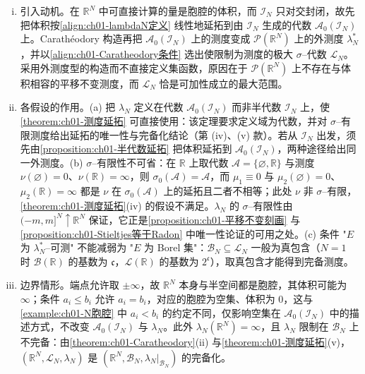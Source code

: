 \documentclass[../../main.tex]{subfiles}%
\begin{document}
\begin{remark}\label{remark:ch01-Lebesgue测度构造}
\begin{enumerate}[(i)]
\item 引入动机。在 $\mathbb{R}^N$ 中可直接计算的量是胞腔的体积，而 $\mathcal{I}_N$ 只对交封闭，故先把体积按\eqref{align:ch01-lambdaN定义} 线性地延拓到由 $\mathcal{I}_N$ 生成的代数 $\mathcal{A}_0(\mathcal{I}_N)$ 上。Carathéodory 构造再把 $\mathcal{A}_0(\mathcal{I}_N)$ 上的测度变成 $\mathcal{P}(\mathbb{R}^N)$ 上的外测度 $\lambda_N^*$，并以\eqref{align:ch01-Caratheodory条件} 选出使限制为测度的极大 $\sigma$--代数 $\mathcal{L}_N$。采用外测度型的构造而不直接定义集函数，原因在于 $\mathcal{P}(\mathbb{R}^N)$ 上不存在与体积相容的平移不变测度，而 $\mathcal{L}_N$ 恰是可加性成立的最大范围。
\item 各假设的作用。(a) 把 $\lambda_N$ 定义在代数 $\mathcal{A}_0(\mathcal{I}_N)$ 而非半代数 $\mathcal{I}_N$ 上，使\cref{theorem:ch01-测度延拓} 可直接使用：该定理要求定义域为代数，并对 $\sigma$--有限测度给出延拓的唯一性与完备化结论（第 (iv)、(v) 款）。若从 $\mathcal{I}_N$ 出发，须先由\cref{proposition:ch01-半代数延拓} 把体积延拓到 $\mathcal{A}_0(\mathcal{I}_N)$，两种途径给出同一外测度。(b) $\sigma$--有限性不可省：在 $\mathbb{R}$ 上取代数 $\mathcal{A}=\{\varnothing,\mathbb{R}\}$ 与测度 $\nu(\varnothing)=0$、$\nu(\mathbb{R})=\infty$，则 $\sigma_0(\mathcal{A})=\mathcal{A}$，而 $\mu_1\equiv0$ 与 $\mu_2(\varnothing)=0$、$\mu_2(\mathbb{R})=\infty$ 都是 $\nu$ 在 $\sigma_0(\mathcal{A})$ 上的延拓且二者不相等；此处 $\nu$ 非 $\sigma$--有限，\cref{theorem:ch01-测度延拓}(iv) 的假设不满足。$\lambda_N$ 的 $\sigma$--有限性由 $(-m,m]^N\uparrow\mathbb{R}^N$ 保证，它正是\cref{proposition:ch01-平移不变刻画} 与\cref{proposition:ch01-Stieltjes等于Radon} 中唯一性论证的可用之处。(c) 条件 "$E$ 为 $\lambda_N^*$--可测" 不能减弱为 "$E$ 为 Borel 集"：$\mathcal{B}_N\subseteq\mathcal{L}_N$ 一般为真包含（$N=1$ 时 $\mathcal{B}(\mathbb{R})$ 的基数为 $\mathfrak{c}$，$\mathcal{L}(\mathbb{R})$ 的基数为 $2^{\mathfrak{c}}$），取真包含才能得到完备测度。
\item 边界情形。端点允许取 $\pm\infty$，故 $\mathbb{R}^N$ 本身与半空间都是胞腔，其体积可能为 $\infty$；条件 $a_i\leqslant b_i$ 允许 $a_i=b_i$，对应的胞腔为空集、体积为 $0$，这与\cref{example:ch01-N胞腔} 中 $a_i<b_i$ 的约定不同，仅影响空集在 $\mathcal{A}_0(\mathcal{I}_N)$ 中的描述方式，不改变 $\mathcal{A}_0(\mathcal{I}_N)$ 与 $\lambda_N$。此外 $\lambda_N(\mathbb{R}^N)=\infty$，且 $\lambda_N$ 限制在 $\mathcal{B}_N$ 上不完备：由\cref{theorem:ch01-Caratheodory}(ii) 与\cref{theorem:ch01-测度延拓}(v)，$(\mathbb{R}^N,\mathcal{L}_N,\lambda_N)$ 是 $(\mathbb{R}^N,\mathcal{B}_N,\lambda_N|_{\mathcal{B}_N})$ 的完备化。
\end{enumerate}
\end{remark}
\end{document}
